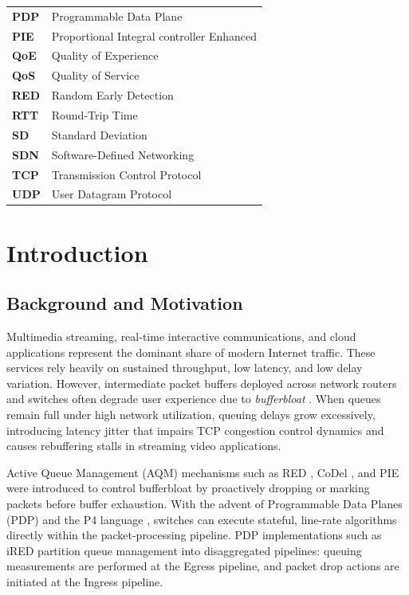 \documentclass[12pt,a4paper,oneside]{report}
\begin{document}
\begin{longtable}{>{\bfseries}p{}p{}}
PDP & Programmable Data Plane \\
PIE & Proportional Integral controller Enhanced \\
QoE & Quality of Experience \\
QoS & Quality of Service \\
RED & Random Early Detection \\
RTT & Round-Trip Time \\
SD & Standard Deviation \\
SDN & Software-Defined Networking \\
TCP & Transmission Control Protocol \\
UDP & User Datagram Protocol \\
\end{longtable}

\cleardoublepage
{}
\setcounter{page}{1}
\pagestyle{fancy}

\chapter{Introduction}
\label{ch:intro}

\section{Background and Motivation}
Multimedia streaming, real-time interactive communications, and cloud applications represent the dominant share of modern Internet traffic. These services rely heavily on sustained throughput, low latency, and low delay variation. However, intermediate packet buffers deployed across network routers and switches often degrade user experience due to \emph{bufferbloat} \cite{getty2011bufferbloat}. When queues remain full under high network utilization, queuing delays grow excessively, introducing latency jitter that impairs TCP congestion control dynamics and causes rebuffering stalls in streaming video applications.

Active Queue Management (AQM) mechanisms such as RED \cite{floyd1993red}, CoDel \cite{nichols2012codel}, and PIE \cite{pan2013pie} were introduced to control bufferbloat by proactively dropping or marking packets before buffer exhaustion. With the advent of Programmable Data Planes (PDP) and the P4 language \cite{bosshart2014p4}, switches can execute stateful, line-rate algorithms directly within the packet-processing pipeline. PDP implementations such as iRED \cite{silva2021ired} partition queue management into disaggregated pipelines: queuing measurements are performed at the Egress pipeline, and packet drop actions are initiated at the Ingress pipeline.
\end{document}
